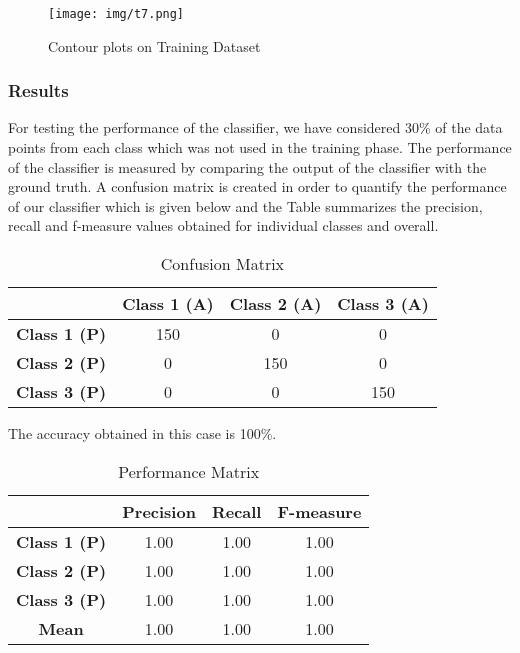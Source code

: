 \begin{figure}[!hbt]
     \centering
     \texttt{[image: img/t7.png]}
     \caption{Contour plots on Training Dataset}
     \label{tab:arch29}
\end{figure}

\subsubsection{Results}
For testing the performance of the classifier, we have considered 30\% of the data points from each class which was not used in the training phase. The performance of the classifier is measured by comparing the output of the classifier with the ground truth. A confusion matrix is created in order to quantify the performance of our classifier which is given below and the Table summarizes
the precision, recall and f-measure values obtained for individual classes and overall.\\

\begin{table}[H]
\centering
\begin{tabular}{|c|c|c|c|}
\hline
\ & \textbf{Class 1 (A)} & \textbf{Class 2 (A)} & \textbf{Class 3 (A)}\\
\hline
\textbf{Class 1 (P)} & 150 & 0 & 0 \\
\hline 
\textbf{Class 2 (P)} & 0 & 150 & 0 \\
\hline
\textbf{Class 3 (P)} & 0 & 0 & 150 \\
\hline
\end{tabular}
\caption{Confusion Matrix}
\label{tab:arch29}
\end{table}

The accuracy obtained in this case is 100\%.\\

\begin{table}[H]
\centering
\begin{tabular}{|c|c|c|c|}
\hline
\ & \textbf{Precision} & \textbf{Recall} & \textbf{F-measure}\\
\hline
\textbf{Class 1 (P)} & 1.00 & 1.00 & 1.00 \\
\hline 
\textbf{Class 2 (P)} & 1.00 & 1.00 & 1.00 \\
\hline
\textbf{Class 3 (P)} & 1.00 & 1.00 & 1.00 \\
\hline
\textbf{Mean} & 1.00 & 1.00 & 1.00 \\
\hline
\end{tabular}
\caption{Performance Matrix}
\label{tab:arch29}
\end{table}

